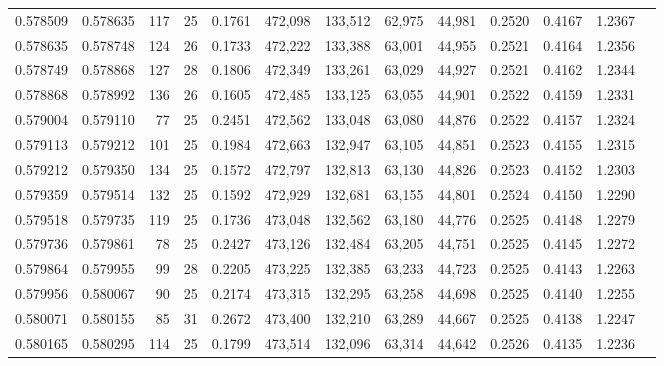 \begin{tabular}{rrrrrrrrrrrrr}
0.578509 & 0.578635 & 117 &  25 &                                     0.1761 & 472,098 & 133,512 &  62,975 &  44,981 & 0.2520 & 0.4167 & 1.2367 \\
0.578635 & 0.578748 & 124 &  26 &                                     0.1733 & 472,222 & 133,388 &  63,001 &  44,955 & 0.2521 & 0.4164 & 1.2356 \\
0.578749 & 0.578868 & 127 &  28 &                                     0.1806 & 472,349 & 133,261 &  63,029 &  44,927 & 0.2521 & 0.4162 & 1.2344 \\
0.578868 & 0.578992 & 136 &  26 &                                     0.1605 & 472,485 & 133,125 &  63,055 &  44,901 & 0.2522 & 0.4159 & 1.2331 \\
0.579004 & 0.579110 &  77 &  25 &                                     0.2451 & 472,562 & 133,048 &  63,080 &  44,876 & 0.2522 & 0.4157 & 1.2324 \\
0.579113 & 0.579212 & 101 &  25 &                                     0.1984 & 472,663 & 132,947 &  63,105 &  44,851 & 0.2523 & 0.4155 & 1.2315 \\
0.579212 & 0.579350 & 134 &  25 &                                     0.1572 & 472,797 & 132,813 &  63,130 &  44,826 & 0.2523 & 0.4152 & 1.2303 \\
0.579359 & 0.579514 & 132 &  25 &                                     0.1592 & 472,929 & 132,681 &  63,155 &  44,801 & 0.2524 & 0.4150 & 1.2290 \\
0.579518 & 0.579735 & 119 &  25 &                                     0.1736 & 473,048 & 132,562 &  63,180 &  44,776 & 0.2525 & 0.4148 & 1.2279 \\
0.579736 & 0.579861 &  78 &  25 &                                     0.2427 & 473,126 & 132,484 &  63,205 &  44,751 & 0.2525 & 0.4145 & 1.2272 \\
0.579864 & 0.579955 &  99 &  28 &                                     0.2205 & 473,225 & 132,385 &  63,233 &  44,723 & 0.2525 & 0.4143 & 1.2263 \\
0.579956 & 0.580067 &  90 &  25 &                                     0.2174 & 473,315 & 132,295 &  63,258 &  44,698 & 0.2525 & 0.4140 & 1.2255 \\
0.580071 & 0.580155 &  85 &  31 &                                     0.2672 & 473,400 & 132,210 &  63,289 &  44,667 & 0.2525 & 0.4138 & 1.2247 \\
0.580165 & 0.580295 & 114 &  25 &                                     0.1799 & 473,514 & 132,096 &  63,314 &  44,642 & 0.2526 & 0.4135 & 1.2236 \\

\end{tabular}
